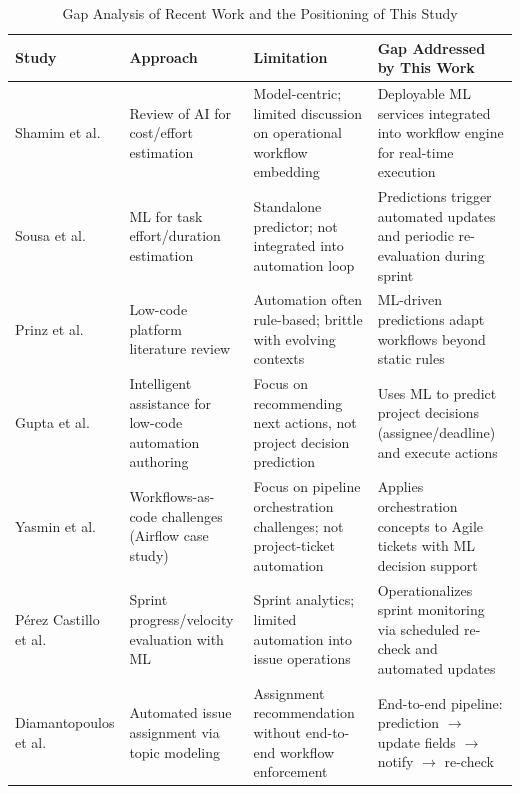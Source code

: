 \documentclass[conference]{IEEEtran}
\begin{document}
\begin{table}[t]
\caption{Gap Analysis of Recent Work and the Positioning of This Study}
\centering
\renewcommand{\arraystretch}{1.25}
\begin{tabular}{p{3.2cm} p{4.0cm} p{4.5cm} p{5.0cm}}
\hline
\textbf{Study} & \textbf{Approach} & \textbf{Limitation} & \textbf{Gap Addressed by This Work} \\
\hline
Shamim et al. \cite{shamim2025_costreview} &
Review of AI for cost/effort estimation &
Model-centric; limited discussion on operational workflow embedding &
Deployable ML services integrated into workflow engine for real-time execution \\

Sousa et al. \cite{sousa2023_task_effort} &
ML for task effort/duration estimation &
Standalone predictor; not integrated into automation loop &
Predictions trigger automated updates and periodic re-evaluation during sprint \\

Prinz et al. \cite{prinz2021_lowcode_slr} &
Low-code platform literature review &
Automation often rule-based; brittle with evolving contexts &
ML-driven predictions adapt workflows beyond static rules \\

Gupta et al. \cite{gupta2023_action_suggestions} &
Intelligent assistance for low-code automation authoring &
Focus on recommending next actions, not project decision prediction &
Uses ML to predict project decisions (assignee/deadline) and execute actions \\

Yasmin et al. \cite{yasmin2024_airflow_wac} &
Workflows-as-code challenges (Airflow case study) &
Focus on pipeline orchestration challenges; not project-ticket automation &
Applies orchestration concepts to Agile tickets with ML decision support \\

P\'erez Castillo et al. \cite{perezcastillo2024_sprint_velocity} &
Sprint progress/velocity evaluation with ML &
Sprint analytics; limited automation into issue operations &
Operationalizes sprint monitoring via scheduled re-check and automated updates \\

Diamantopoulos et al. \cite{diamantopoulos2023_issue_assignment} &
Automated issue assignment via topic modeling &
Assignment recommendation without end-to-end workflow enforcement &
End-to-end pipeline: prediction $\rightarrow$ update fields $\rightarrow$ notify $\rightarrow$ re-check \\


\end{tabular}
\end{table}
\end{document}
